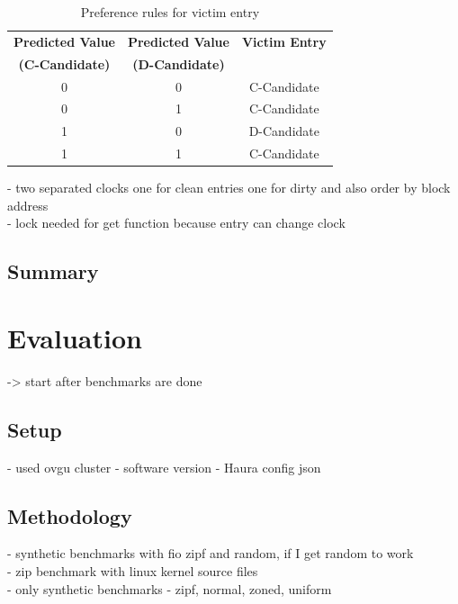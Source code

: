 \documentclass[
	12pt,
	a4paper,
	abstract,
	bibliography=totoc,
	chapterprefix,
	headings=openright,
	numbers=endperiod,
	parskip=half,
	twoside,
]{scrreprt}
\begin{document}
\begin{table}[ht]
	\centering
	\begin{tabular}{|c|c|c|}
		\hline
		\textbf{Predicted Value} & \textbf{Predicted Value} & \textbf{Victim Entry} \\
		\textbf{(C-Candidate)} & \textbf{(D-Candidate)} & \\
		\hline
		0 & 0 & C-Candidate \\
		\hline
		0 & 1 & C-Candidate \\
		\hline
		1 & 0 & D-Candidate \\
		\hline
		1 & 1 & C-Candidate \\
		\hline
	\end{tabular}
	\caption{Preference rules for victim entry}
	\label{tab:ml-clock preference rules}
\end{table}

- two separated clocks one for clean entries one for dirty and also order by block address \\
- lock needed for get function because entry can change clock

\section{Summary}

\chapter{Evaluation}
\label{cha:evaluation}



-> start after benchmarks are done

\section{Setup}

- used ovgu cluster
- software version 
- Haura config json


\section{Methodology}
- synthetic benchmarks with fio zipf and random, if I get random to work\\
- zip benchmark with linux kernel source files\\
- only synthetic benchmarks 
- zipf, normal, zoned, uniform 
\end{document}
